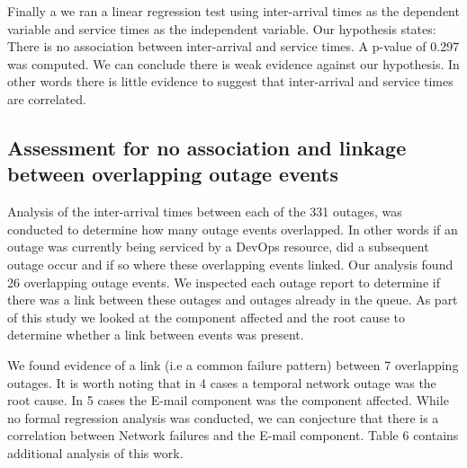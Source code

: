 \documentclass[5p]{elsarticle}
\begin{document}
Finally a we ran a linear regression test using inter-arrival times as the dependent variable and service times as the independent variable. Our hypothesis states: There is no association between inter-arrival and service times. A p-value of 0.297 was computed. We can conclude there is weak evidence against our hypothesis. In other words there is little evidence to suggest that inter-arrival and service times are correlated. 

\subsection{Assessment for no association and linkage between overlapping outage events}

Analysis of the inter-arrival times between each of the 331 outages, was conducted to determine how many outage events overlapped. In other words if an outage was currently being serviced by a DevOps resource, did a subsequent outage occur and if so where these overlapping events linked. Our analysis found 26 overlapping outage events. We inspected each outage report to determine if there was a link between these outages and outages already in the queue. As part of this study we looked at the component affected and the root cause to determine whether a link between events was present. 

We found evidence of a link (i.e a common failure pattern) between 7 overlapping outages. It is worth noting that in 4 cases a temporal network outage was the root cause. In 5 cases the E-mail component was the component affected. While no formal regression analysis was conducted, we can conjecture that there is a correlation between Network failures and the E-mail component. Table 6 contains additional analysis of this work.
\end{document}
